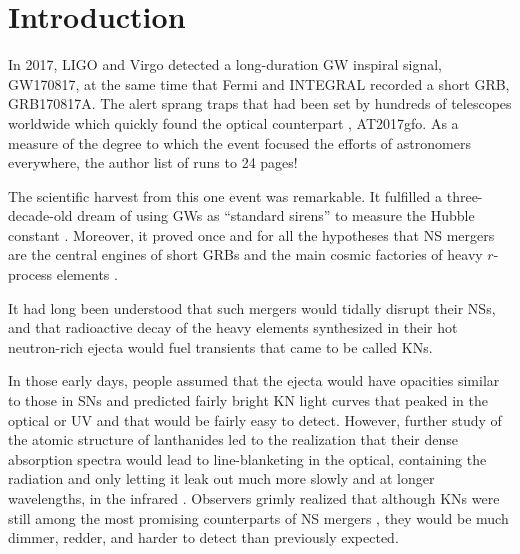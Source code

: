 \documentclass[twocolumn,times]{aastex631}
\begin{document}
\acresetall

\section{Introduction} \label{sec:intro}

In 2017, \ac{LIGO} and Virgo \citep{2017PhRvL.119p1101A} detected a long-duration \ac{GW} inspiral signal, GW170817, at the same time that Fermi \citep{2017ApJ...848L..14G} and INTEGRAL \citep{2017ApJ...848L..15S} recorded a short \ac{GRB}, GRB170817A. The alert sprang traps that had been set by hundreds of telescopes worldwide \citep{2014ApJS..211....7A,2016ApJ...826L..13A} which quickly found the optical counterpart \citep{2017Sci...358.1556C}, AT2017gfo. As a measure of the degree to which the event focused the efforts of astronomers everywhere, the author list of \citet{2017ApJ...848L..12A} runs to 24 pages!

The scientific harvest from this one event was remarkable. It fulfilled a three-decade-old dream of using \acp{GW} as ``standard sirens'' to measure the Hubble constant \citep{1986Natur.323..310S,2017Natur.551...85A}. Moreover, it proved once and for all the hypotheses that \ac{NS} mergers are the central engines of short \acp{GRB} \citep{2013ApJ...776...18F} and the main cosmic factories of heavy $r$-process elements \citep{1999ApJ...525L.121F}. 

It had long been understood that such mergers would tidally disrupt their \acp{NS}, and that radioactive decay of the heavy elements synthesized in their hot neutron-rich ejecta would fuel transients \citep{1974ApJ...192L.145L,1989Natur.340..126E,1998ApJ...507L..59L} that came to be called \acp{KN}.

In those early days, people assumed that the ejecta would have opacities similar to those in \acp{SN} and predicted fairly bright \ac{KN} light curves that peaked in the optical or \ac{UV} and that would be fairly easy to detect. However, further study of the atomic structure of lanthanides led to the realization that their dense absorption spectra would lead to line-blanketing in the optical, containing the radiation and only letting it leak out much more slowly and at longer wavelengths, in the infrared \citep{2013ApJ...774...25K}. Observers grimly realized that although \acp{KN} were still among the most promising counterparts of \ac{NS} mergers \citep{2012ApJ...746...48M}, they would be much dimmer, redder, and harder to detect than previously expected.
\end{document}

